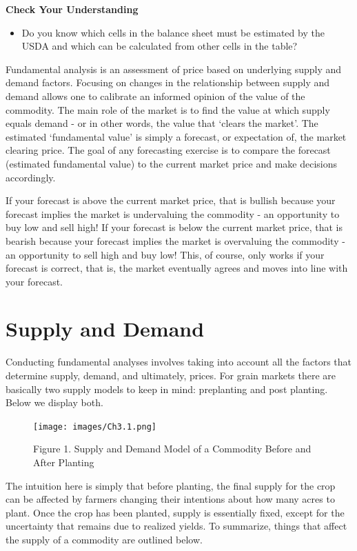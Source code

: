 \documentclass[
]{book}
\providecommand{\tightlist}{%
  \setlength{\itemsep}{0pt}\setlength{\parskip}{0pt}}
\begin{document}
\textbf{Check Your Understanding}

\begin{itemize}
\tightlist
\item
  Do you know which cells in the balance sheet must be estimated by the USDA and which can be calculated from other cells in the table?
\end{itemize}

Fundamental analysis is an assessment of price based on underlying supply and demand factors. Focusing on changes in the relationship between supply and demand allows one to calibrate an informed opinion of the value of the commodity. The main role of the market is to find the value at which supply equals demand - or in other words, the value that `clears the market'. The estimated `fundamental value' is simply a forecast, or expectation of, the market clearing price. The goal of any forecasting exercise is to compare the forecast (estimated fundamental value) to the current market price and make decisions accordingly.

If your forecast is above the current market price, that is bullish because your forecast implies the market is undervaluing the commodity - an opportunity to buy low and sell high! If your forecast is below the current market price, that is bearish because your forecast implies the market is overvaluing the commodity - an opportunity to sell high and buy low! This, of course, only works if your forecast is correct, that is, the market eventually agrees and moves into line with your forecast.

\hypertarget{supply-and-demand}{%
\section{Supply and Demand}\label{supply-and-demand}}

Conducting fundamental analyses involves taking into account all the factors that determine supply, demand, and ultimately, prices. For grain markets there are basically two supply models to keep in mind: preplanting and post planting. Below we display both.

\begin{figure}
\centering
\texttt{[image: images/Ch3.1.png]}
\caption{Figure 1. Supply and Demand Model of a Commodity Before and After Planting}
\end{figure}

The intuition here is simply that before planting, the final supply for the crop can be affected by farmers changing their intentions about how many acres to plant. Once the crop has been planted, supply is essentially fixed, except for the uncertainty that remains due to realized yields. To summarize, things that affect the supply of a commodity are outlined below.
\end{document}
